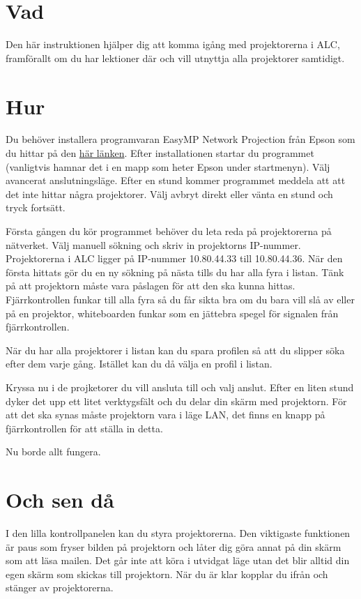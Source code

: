 \documentclass[11pt]{article}
\begin{document}
\section{Vad}
    Den här instruktionen hjälper dig att komma igång med projektorerna i ALC, framförallt om du har lektioner där
    och vill utnyttja alla projektorer samtidigt.
\section{Hur}
    Du behöver installera programvaran EasyMP Network Projection från Epson som du hittar på den \href{https://ftp.epson.com/drivers/epson16189.exe}{här länken}.
    Efter installationen startar du programmet (vanligtvis hamnar det i en mapp som heter Epson under startmenyn). Välj avancerat anslutningsläge.
    Efter en stund kommer programmet meddela att att det inte hittar några projektorer. Välj avbryt direkt eller vänta en stund och tryck fortsätt.

    Första gången du kör programmet behöver du leta reda på projektorerna på nätverket. Välj manuell sökning och skriv in projektorns IP-nummer.
    Projektorerna i ALC ligger på IP-nummer 10.80.44.33 till 10.80.44.36. När den första hittats gör du en ny sökning på nästa tills du har alla fyra i listan.
    Tänk på att projektorn måste vara påslagen för att den ska kunna hittas. Fjärrkontrollen funkar till alla fyra så du får sikta
    bra om du bara vill slå av eller på en projektor, whiteboarden funkar som en jättebra spegel för signalen från fjärrkontrollen.

    När du har alla projektorer i listan kan du spara profilen så att du slipper söka efter dem varje gång. Istället kan du då välja en profil i listan.

    Kryssa nu i de projketorer du vill ansluta till och valj anslut. Efter en liten stund dyker det upp ett litet verktygsfält
    och du delar din skärm med projektorn. För att det ska synas måste projektorn vara i läge LAN, det finns en knapp på fjärrkontrollen för att ställa in detta.

    Nu borde allt fungera.
\section{Och sen då}
    I den lilla kontrollpanelen kan du styra projektorerna. Den viktigaste funktionen är paus som fryser bilden på projektorn och låter dig
    göra annat på din skärm som att läsa mailen. Det går inte att köra i utvidgat läge utan det blir alltid din egen skärm som skickas till projektorn.
    När du är klar kopplar du ifrån och stänger av projektorerna.
\end{document}

